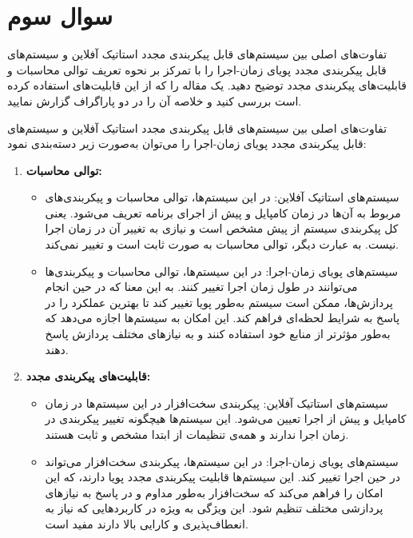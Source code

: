 \section{سوال سوم}



تفاوت‌های اصلی بین سیستم‌های قابل پیکربندی مجدد استاتیک آفلاین و سیستم‌های قابل پیکربندی مجدد پویای زمان-اجرا را با تمرکز بر نحوه تعریف توالی محاسبات و قابلیت‌های پیکربندی مجدد توضیح دهید. یک مقاله را که از این قابلیت‌های  استفاده کرده است بررسی کنید و خلاصه آن را در دو پاراگراف گزارش نمایید.


\begin{qsolve}
	تفاوت‌های اصلی بین سیستم‌های قابل پیکربندی مجدد استاتیک آفلاین و سیستم‌های قابل پیکربندی مجدد پویای زمان-اجرا را می‌توان به‌صورت زیر دسته‌بندی نمود:
	
	
	\begin{enumerate}
		\item \textbf{توالی محاسبات:}
		\begin{itemize}
			\item 
			سیستم‌های استاتیک آفلاین: در این سیستم‌ها، توالی محاسبات و پیکربندی‌های مربوط به آن‌ها در زمان کامپایل و پیش از اجرای برنامه تعریف می‌شود. یعنی کل پیکربندی سیستم از پیش مشخص است و نیازی به تغییر آن در زمان اجرا نیست. به عبارت دیگر، توالی محاسبات به صورت ثابت است و تغییر نمی‌کند.
			
			
			\item 
			سیستم‌های پویای زمان-اجرا: در این سیستم‌ها، توالی محاسبات و پیکربندی‌ها می‌توانند در طول زمان اجرا تغییر کنند. به این معنا که در حین انجام پردازش‌ها، ممکن است سیستم به‌طور پویا تغییر کند تا بهترین عملکرد را در پاسخ به شرایط لحظه‌ای فراهم کند. این امکان به سیستم‌ها اجازه می‌دهد که به‌طور مؤثرتر از منابع خود استفاده کنند و به نیازهای مختلف پردازش پاسخ دهند.
		\end{itemize}
		
		
		
		\item \textbf{قابلیت‌های پیکربندی مجدد:}
		\begin{itemize}
			\item 
			سیستم‌های استاتیک آفلاین: پیکربندی سخت‌افزار در این سیستم‌ها در زمان کامپایل و پیش از اجرا تعیین می‌شود. این سیستم‌ها هیچگونه تغییر پیکربندی در زمان اجرا ندارند و همه‌ی تنظیمات از ابتدا مشخص و ثابت هستند.
			
			
			\item 
			سیستم‌های پویای زمان-اجرا: در این سیستم‌ها، پیکربندی سخت‌افزار می‌تواند در حین اجرا تغییر کند. این سیستم‌ها قابلیت پیکربندی مجدد پویا دارند، که این امکان را فراهم می‌کند که سخت‌افزار به‌طور مداوم و در پاسخ به نیازهای پردازشی مختلف تنظیم شود. این ویژگی به ویژه در کاربردهایی که نیاز به انعطاف‌پذیری و کارایی بالا دارند مفید است.
		\end{itemize}
	\end{enumerate}
	

\end{qsolve}
